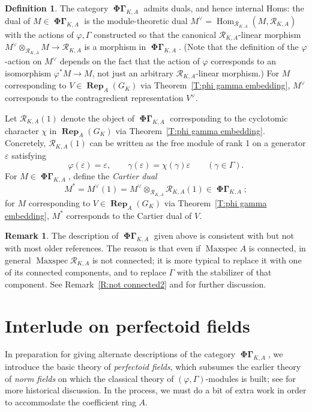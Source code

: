 \documentclass[12pt]{amsart}
\theoremstyle{definition}
\newtheorem{defn}[theorem]{Definition}
\newtheorem{remark}[theorem]{Remark}
\numberwithin{equation}{theorem}
\newcommand{\calR}{\mathcal{R}}
\newcommand{\dual}{\vee}
\DeclareMathOperator{\Hom}{Hom}
\DeclareMathOperator{\Maxspec}{Maxspec}
\DeclareMathOperator{\PhiGamma}{\mathbf{\Phi \Gamma}}
\DeclareMathOperator{\Rep}{\mathbf{Rep}}
\begin{document}
\begin{defn}
The category $\PhiGamma_{K,A}$ admits duals, and hence internal Homs: the dual of $M \in \PhiGamma_{K,A}$ is the module-theoretic dual $M^\dual = \Hom_{\calR_{K,A}}(M, \calR_{K,A})$
with the actions of $\varphi, \Gamma$ constructed so that the canonical $\calR_{K,A}$-linear morphism $M^\dual \otimes_{\calR_{K,A}} M \to \calR_{K,A}$ is a morphism in $\PhiGamma_{K,A}$. (Note that the definition of the $\varphi$-action on $M^\dual$ depends on the fact that the action of $\varphi$ corresponds to an isomorphism $\varphi^*M \to M$, not just an arbitrary $\calR_{K,A}$-linear morphism.)
For $M$ corresponding to $V \in \Rep_A(G_K)$ via Theorem~\ref{T:phi gamma embedding}, $M^\dual$ corresponds to the contragredient representation $V^\dual$.

Let $\calR_{K, A}(1)$ denote the object of $\PhiGamma_{K, A}$ corresponding to the cyclotomic character $\chi$ in $\Rep_A(G_K)$ via Theorem~\ref{T:phi gamma embedding}.
Concretely, $\calR_{K,A}(1)$ can be written as the free module of rank 1 on a generator $\varepsilon$ satisfying
\[
\varphi(\varepsilon) = \varepsilon, \qquad \gamma(\varepsilon) = \chi(\gamma) \varepsilon \qquad (\gamma \in \Gamma).
\]
For $M \in \PhiGamma_{K,A}$, define the \emph{Cartier dual}
\[
M^* = M^\dual(1) = M^\dual \otimes_{\calR_{K,A}} \calR_{K,A}(1) \in \PhiGamma_{K,A};
\]
for $M$ corresponding to $V \in \Rep_A(G_K)$ via Theorem~\ref{T:phi gamma embedding}, $M^*$ corresponds to the Cartier dual of $V$.
\end{defn}



\begin{remark} \label{R:not connected}
The description of $\PhiGamma_{K,A}$ given above is consistent with \cite{kedlaya-new-phigamma} but not with most older references. The reason is that even if $\Maxspec A$ is connected, in general $\Maxspec \calR_{K,A}$ is not connected; it is more typical to replace it with one of its connected components, and to replace $\Gamma$ with the stabilizer of that component.
See Remark~\ref{R:not connected2} and \cite[Remark~2.2.12]{kedlaya-new-phigamma} for further discussion.
\end{remark}

\section{Interlude on perfectoid fields}
\label{sec:perfectoid}

In preparation for giving alternate descriptions of the category $\PhiGamma_{K,A}$, we introduce the basic theory of \emph{perfectoid fields}, which subsumes the earlier theory of \emph{norm fields} on which the classical theory of $(\varphi, \Gamma)$-modules is built; see \cite{kedlaya-new-phigamma} for more historical discussion. In the process, we must do a bit of extra work in order to accommodate the coefficient ring $A$.
\end{document}
